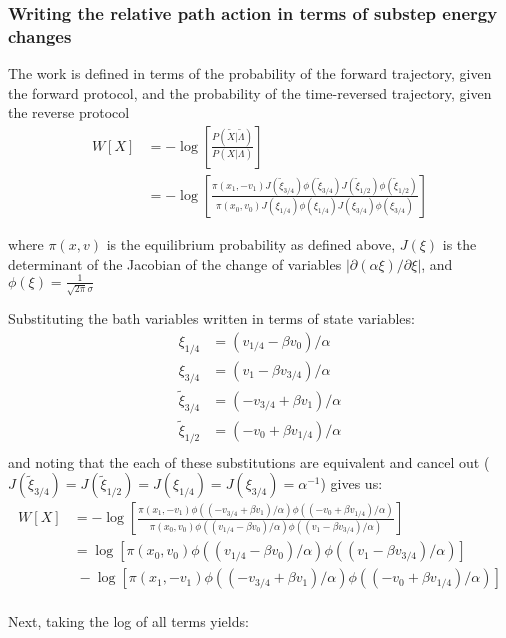 \documentclass[11pt]{article}
\begin{document}
\subsubsection{Writing the relative path action in terms of substep energy changes}
The work is defined in terms of the probability of the forward trajectory, given the forward protocol, and the probability of the time-reversed trajectory, given the reverse protocol
$$\begin{aligned}
W[X] &= - \log \left[ \frac{P(\tilde{X} | \tilde{\Lambda})}{P(X | \Lambda)} \right]\\
&= - \log \left[ 
\frac{\pi(x_1, -v_1) J(\tilde{\xi}_{3/4})  \phi(\tilde{\xi}_{3/4}) J(\tilde{\xi}_{1/2})  \phi(\tilde{\xi}_{1/2}) }
{\pi(x_0, v_0) J(\xi_{1/4}) \phi(\xi_{1/4}) J(\xi_{3/4}) \phi(\xi_{3/4})  } \right]
\end{aligned}$$

where $\pi(x, v)$ is the equilibrium probability as defined above, $J(\xi)$ is the determinant of the Jacobian of the change of variables $| \partial (\alpha \xi) / \partial \xi |$, and $\phi(\xi) = \frac{1}{\sqrt{2 \pi} \sigma}$ 

Substituting the bath variables written in terms of state variables:
$$\begin{aligned}
\xi_{1/4} &= (v_{1/4} - \beta v_0) / \alpha\\
\xi_{3/4} &= (v_1 - \beta v_{3/4}) / \alpha\\
\tilde{\xi}_{3/4} &= (-v_{3/4} + \beta v_{1}) / \alpha\\
\tilde{\xi}_{1/2} &= (-v_{0} + \beta v_{1/4}) / \alpha\\
\end{aligned}$$
and noting that the each of these substitutions are equivalent and cancel out ($J(\tilde{\xi}_{3/4}) = J(\tilde{\xi}_{1/2}) =J(\xi_{1/4}) = J(\xi_{3/4}) = \alpha^{-1}$)
gives us:
$$\begin{aligned}
W[X] &= - \log \left[ 
\frac{\pi(x_1, -v_1) \phi((-v_{3/4} + \beta v_{1}) / \alpha)  \phi((-v_{0} + \beta v_{1/4}) / \alpha) }
{\pi(x_0, v_0) \phi((v_{1/4} - \beta v_0) / \alpha) \phi((v_1 - \beta v_{3/4}) / \alpha)  } \right]\\
&= \log
\left[
\pi(x_0, v_0) \phi((v_{1/4} - \beta v_0) / \alpha) \phi((v_1 - \beta v_{3/4}) / \alpha)
\right] \\
&\;- \log \left[
\pi(x_1, -v_1) \phi((-v_{3/4} + \beta v_{1}) / \alpha)  \phi((-v_{0} + \beta v_{1/4}) / \alpha)  \right]\\
\end{aligned}$$


Next, taking the log of all terms yields:
\end{document}
